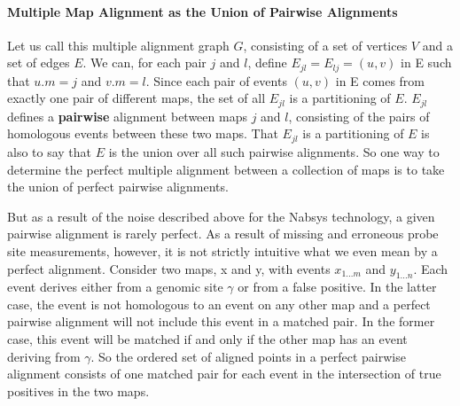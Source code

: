 \documentclass[11pt]{article}
\begin{document}
\paragraph{Multiple Map Alignment as the Union of Pairwise Alignments\newline}
\par{
Let us call this multiple alignment graph $G$, consisting of a set of vertices $V$ and a set of edges $E$. We can, for each pair $j$ and $l$, define $E_{jl}=E_{lj}=(u,v)$ in E such that $u.m = j$ and $v.m = l$. Since each pair of events $(u,v)$ in E comes from exactly one pair of different maps, the set of all $E_{jl}$ is a partitioning of $E$. $E_{jl}$ defines a \textbf{pairwise} alignment between maps $j$ and $l$, consisting of the pairs of homologous events between these two maps.  That {$E_{jl}$} is a partitioning of $E$ is also to say that $E$ is the union over all such pairwise alignments.  So one way to determine the perfect multiple alignment between a collection of maps is to take the union of perfect pairwise alignments.
}
\par{
But as a result of the noise described above for the Nabsys technology, a given pairwise alignment is rarely perfect.  As a result of missing and erroneous probe site measurements, however, it is not strictly intuitive what we even mean by a perfect alignment.  Consider two maps, x and y, with events $x_{1...m}$ and $y_{1...n}$.   Each event derives either from a genomic site $\gamma$ or from a false positive.  In the latter case, the event is not homologous to an event on any other map and a perfect pairwise alignment will not include this event in a matched pair.  In the former case, this event will be matched if and only if the other map has an event deriving from $\gamma$.  So the ordered set of aligned points in a perfect pairwise alignment consists of one matched pair for each event in the intersection of true positives in the two maps.
}
\end{document}
